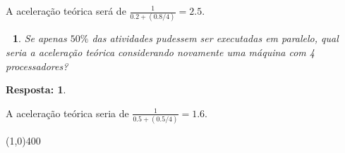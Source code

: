 \documentclass[a4paper, 12pt]{article}
\newtheorem{questioni}{$\,\,$}[question]
\theoremstyle{dotless}
\newtheorem*{answer}{\textbf{Resposta:}}
\begin{document}
A aceleração teórica será de $\frac{1}{0.2 + (0.8 / 4)} = 2.5$.

\vspace*{0.5cm}

\begin{questioni}
    Se apenas $50\%$ das atividades pudessem ser executadas em paralelo, qual seria a aceleração teórica considerando novamente uma máquina com 4 processadores?
\end{questioni}
\begin{answer}
\end{answer}

A aceleração teórica seria de $\frac{1}{0.5 + (0.5 / 4)} = 1.6$.

\begin{center}
    \line(1,0){400}
\end{center}
\end{document}
